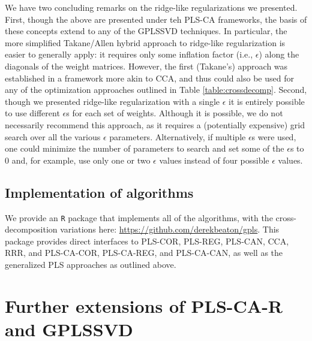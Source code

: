 \documentclass[12pt]{article}
\begin{document}
We have two concluding remarks on the ridge-like regularizations we
presented. First, though the above are presented under teh PLS-CA
frameworks, the basis of these concepts extend to any of the GPLSSVD
techniques. In particular, the more simplified Takane/Allen hybrid
approach to ridge-like regularization is easier to generally apply: it
requires only some inflation factor (i.e., \(\epsilon\)) along the
diagonals of the weight matrices. However, the first (Takane's) approach
was established in a framework more akin to CCA, and thus could also be
used for any of the optimization approaches outlined in Table
\ref{table:crossdecomp}. Second, though we presented ridge-like
regularization with a single \(\epsilon\) it is entirely possible to use
different \(\epsilon\)s for each set of weights. Although it is
possible, we do not necessarily recommend this approach, as it requires
a (potentially expensive) grid search over all the various \(\epsilon\)
parameters. Alternatively, if multiple \(\epsilon\)s were used, one
could minimize the number of parameters to search and set some of the
\(\epsilon\)s to 0 and, for example, use only one or two \(\epsilon\)
values instead of four possible \(\epsilon\) values.

\hypertarget{implementation-of-algorithms}{%
\subsection{Implementation of
algorithms}\label{implementation-of-algorithms}}

We provide an \texttt{R} package that implements all of the algorithms,
with the cross-decomposition variations here:
\url{https://github.com/derekbeaton/gpls}. This package provides direct
interfaces to PLS-COR, PLS-REG, PLS-CAN, CCA, RRR, and PLS-CA-COR,
PLS-CA-REG, and PLS-CA-CAN, as well as the generalized PLS approaches as
outlined above.

\hypertarget{further-extensions-of-pls-ca-r-and-gplssvd}{%
\section{Further extensions of PLS-CA-R and
GPLSSVD}\label{further-extensions-of-pls-ca-r-and-gplssvd}}
\end{document}
